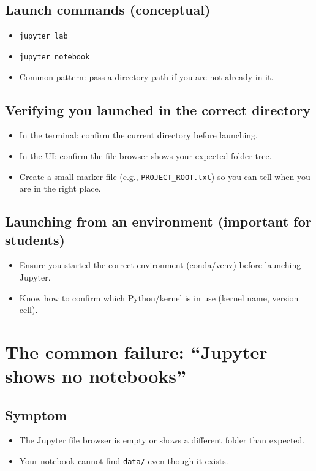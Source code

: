 \subsection{Launch commands (conceptual)}
\begin{itemize}
\item \texttt{jupyter lab}
\item \texttt{jupyter notebook}
\item Common pattern: pass a directory path if you are not already in it.
\end{itemize}

\subsection{Verifying you launched in the correct directory}
\begin{itemize}
\item In the terminal: confirm the current directory before launching.
\item In the UI: confirm the file browser shows your expected folder tree.
\item Create a small marker file (e.g., \texttt{PROJECT\_ROOT.txt}) so you can tell when you are in the right place.
\end{itemize}

\subsection{Launching from an environment (important for students)}
\begin{itemize}
\item Ensure you started the correct environment (conda/venv) before launching Jupyter.
\item Know how to confirm which Python/kernel is in use (kernel name, version cell).
\end{itemize}

\section{The common failure: ``Jupyter shows no notebooks''}
\subsection{Symptom}
\begin{itemize}
\item The Jupyter file browser is empty or shows a different folder than expected.
\item Your notebook cannot find \texttt{data/} even though it exists.
\end{itemize}

